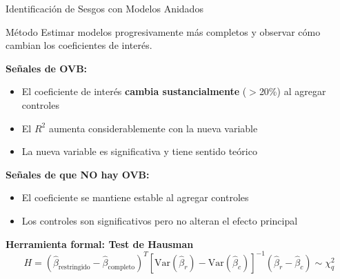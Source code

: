 \documentclass[aspectratio=169,11pt]{beamer}
\begin{document}
\begin{frame}{Identificaci\'on de Sesgos con Modelos Anidados}
\small
\begin{block}{M\'etodo}
    Estimar modelos progresivamente m\'as completos y observar c\'omo cambian los coeficientes de inter\'es.
\end{block}

\vspace{0.2cm}
\textbf{Se\~nales de OVB:}
\begin{itemize}
    \setlength{\itemsep}{3pt}
    \item El coeficiente de inter\'es \textbf{cambia sustancialmente} ($>$20\%) al agregar controles
    \item El $R^2$ aumenta considerablemente con la nueva variable
    \item La nueva variable es significativa y tiene sentido te\'orico
\end{itemize}

\vspace{0.2cm}
\textbf{Se\~nales de que NO hay OVB:}
\begin{itemize}
    \setlength{\itemsep}{3pt}
    \item El coeficiente se mantiene estable al agregar controles
    \item Los controles son significativos pero no alteran el efecto principal
\end{itemize}

\vspace{0.2cm}
\textbf{Herramienta formal: Test de Hausman}
\[
H = (\hat{\beta}_{\text{restringido}} - \hat{\beta}_{\text{completo}})^T [\text{Var}(\hat{\beta}_r) - \text{Var}(\hat{\beta}_c)]^{-1} (\hat{\beta}_r - \hat{\beta}_c) \sim \chi^2_q
\]
\end{frame}
\end{document}
